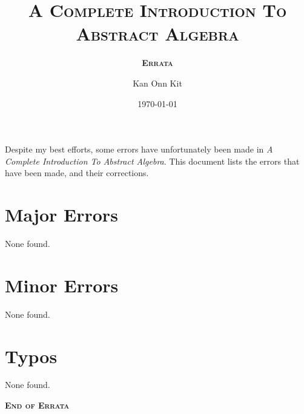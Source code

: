 \documentclass[
    a4paper,
    chapterprefix,
    DIV=9
]{scrartcl}
\title{\bfseries\scshape A Complete Introduction To\\Abstract Algebra}
\subtitle{\bfseries\scshape Errata}
\date{\today}
\author{Kan Onn Kit}
\begin{document}
\maketitle

Despite my best efforts, some errors have unfortunately been made in \textit{A Complete Introduction To Abstract Algebra}. This document lists the errors that have been made, and their corrections.

\section*{Major Errors}
None found.

\section*{Minor Errors}
None found.

\section*{Typos}
None found.

\begin{center}
    \vfill
    {\Large\bfseries\scshape End of Errata}
\end{center}
\end{document}
